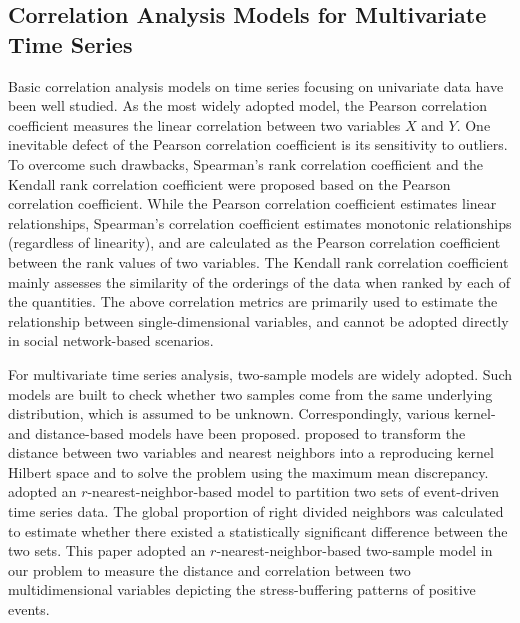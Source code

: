 \documentclass[5p,times,numbers,authoryear]{elsarticle}
\begin{document}
\subsection{Correlation Analysis Models for Multivariate Time Series}
Basic correlation analysis models on time series focusing on univariate data have been well studied.
As the most widely adopted model, the Pearson correlation coefficient \cite{Cohen1988Statistical} measures the linear correlation between two variables $X$ and $Y$.
One inevitable defect of the Pearson correlation coefficient is its sensitivity to outliers.
To overcome such drawbacks, Spearman's rank correlation coefficient \cite{C1987The} and the Kendall rank correlation coefficient \cite{Mcleod2011Kendall} were proposed based on the Pearson correlation coefficient.
While the Pearson correlation coefficient estimates linear relationships,
Spearman's correlation coefficient estimates monotonic relationships (regardless of linearity),
and are calculated as the Pearson correlation coefficient between the rank values of two variables.
The Kendall rank correlation coefficient mainly assesses the similarity of the orderings of the data when ranked by each of the quantities.
The above correlation metrics are primarily used to estimate the relationship between single-dimensional variables, and cannot be adopted directly in social network-based scenarios.

For multivariate time series analysis, two-sample models are widely adopted.
Such models are built to check whether two samples come from the same underlying distribution,
which is assumed to be unknown.
Correspondingly, various kernel- \citep{Sch2006A} and distance-based models \citep{Schilling1986Multivariate} have been proposed.
\citep{Sch2006A} proposed to transform the distance between two variables and nearest neighbors into a reproducing kernel Hilbert space and to solve the problem using the maximum mean discrepancy.
\citep{Schilling1986Multivariate} adopted an $r$-nearest-neighbor-based model to partition two sets of event-driven time series data.
The global proportion of
{right divided neighbors}
was calculated to estimate whether there existed a statistically significant difference between the two sets.
This paper adopted an $r$-nearest-neighbor-based two-sample model in our problem to measure the distance and correlation between two multidimensional variables depicting
the stress-buffering patterns of positive events.
\end{document}
